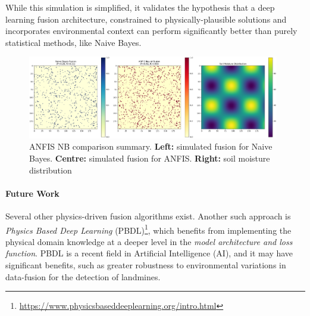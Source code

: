     While this simulation is simplified, it validates the hypothesis that a deep learning fusion architecture, constrained to physically-plausible solutions and incorporates environmental context can perform significantly better than purely statistical methods, like Naive Bayes.

    \begin{figure}[h]
        \centering
        \includegraphics[width=0.98\textwidth]{figs/Rory/0_summary.png}
        \caption{ANFIS NB comparison summary. \textbf{Left:} simulated fusion for Naive Bayes. \textbf{Centre:} simulated fusion for ANFIS. \textbf{Right:} soil moisture distribution}
        \label{fig:anfis_summary}
    \end{figure}

    \paragraph{Future Work} 

        Several other physics-driven fusion algorithms exist. Another such approach is \textit{Physics Based Deep Learning} (PBDL)\footnote{\url{https://www.physicsbaseddeeplearning.org/intro.html}}, which benefits from implementing the physical domain knowledge at a deeper level in the \textit{model architecture and loss function}. PBDL is a recent field in Artificial Intelligence (AI), and it may have significant benefits, such as greater robustness to environmental variations in data-fusion for the detection of landmines.
